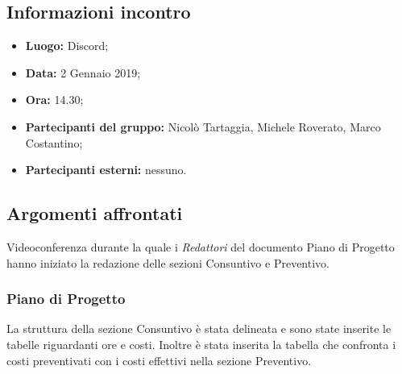 \subsection{Informazioni incontro}
\begin{itemize}
	\item { \textbf{Luogo:} Discord;  }
	\item { \textbf{Data:} 2 Gennaio 2019; }
	\item { \textbf{Ora:} 14.30; }
	\item { \textbf{Partecipanti del gruppo:} Nicolò Tartaggia, Michele Roverato, Marco Costantino;}
	\item { \textbf{Partecipanti esterni:} nessuno. }
\end{itemize}


\subsection{Argomenti affrontati}
Videoconferenza durante la quale i \emph{Redattori} del documento Piano di Progetto hanno iniziato la redazione delle sezioni Consuntivo e Preventivo.

\subsubsection{Piano di Progetto}
La struttura della sezione Consuntivo è stata delineata e sono state inserite le tabelle riguardanti ore e costi. Inoltre è stata inserita la tabella che confronta i costi preventivati con i costi effettivi nella sezione Preventivo.